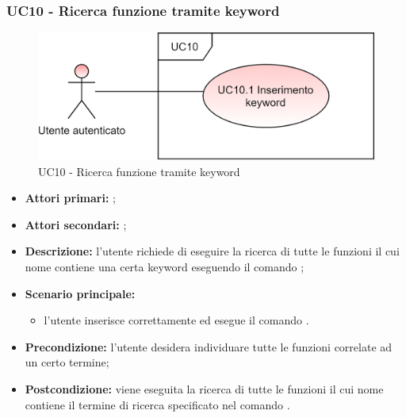 \subsubsection{UC10 - Ricerca funzione tramite keyword}
\begin{figure}[H]
	\centering
	\includegraphics[scale=\ucs]{./res/img/UC10.png}
	\caption {UC10 - Ricerca funzione tramite keyword}
\end{figure}
\begin{itemize}
	\item \textbf{Attori primari:} \ua{};
	\item \textbf{Attori secondari:} \re{};
	\item \textbf{Descrizione:} l’utente richiede di eseguire la ricerca di tutte le funzioni il cui nome contiene una certa keyword eseguendo il comando \psearch{};
	\item \textbf{Scenario principale:} 
	\begin{itemize}
		\item l’utente inserisce correttamente ed esegue il comando \psearch{}.
	\end{itemize}
	\item \textbf{Precondizione:} l’utente desidera individuare tutte le funzioni correlate ad un certo termine;
	\item \textbf{Postcondizione:} viene eseguita la ricerca di tutte le funzioni il cui nome contiene il termine di ricerca specificato nel comando \search{}.
\end{itemize}
